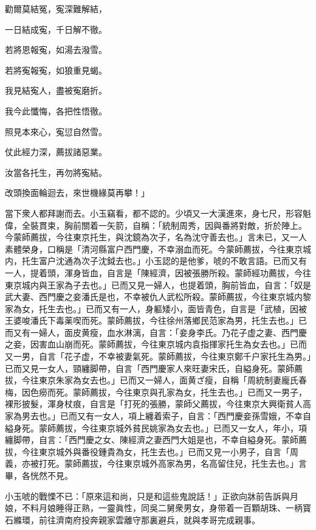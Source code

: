 \begin{myquote}
勸爾莫結冤，寃深難解結，

一日結成寃，千日解不徹。

若將恩報寃，如湯去潑雪。

若將寃報寃，如狼重見蝎。

我見結寃人，盡被寃磨折。

我今此懺悔，各把性悟徹。

照見本來心，寃愆自然雪。

仗此經力深，薦拔諸惡業。

汝當各托生，再勿將寃結。

改頭換面輪迴去，來世機緣莫再攀！」
\end{myquote}

當下衆人都拜謝而去。小玉竊看，都不認的。少頃又一大漢進來，身七尺，形容魁偉，全裝貫束，胸前關着一矢箭，自稱：「統制周秀，因與番將對敵，折於陣上。今蒙師薦拔，今往東京托生，與沈鏡為次子，名為沈守善去也。」言未已，又一人素體榮身，口稱是「清河縣富户西門慶，不幸溺血而死。今蒙師薦拔，今往東京城内，托生富户沈通為次子沈鉞去也。」小玉認的是他爹，唬的不敢言語。已而又有一人，提着頭，渾身皆血，自言是「陳經濟，因被張勝所殺。蒙師經功薦拔，今往東京城内與王家為子去也。」已而又見一婦人，也提着頭，胸前皆血，自言：「奴是武大妻、西門慶之妾潘氏是也，不幸被仇人武松所殺。蒙師薦拔，今往東京城内黎家為女，托生去也。」已而又有一人，身軀矮小，面皆青色，自言是「武植，因被王婆唆潘氏下毒薬喫而死。蒙師薦拔，今往徐州落鄉民范家為男，托生去也。」已而又有一婦人，面皮黄瘦，血水淋漓，自言：「妾身李氏。乃花子虚之妻、西門慶之妾，因害血山崩而死。蒙師薦拔，今往東京城内袁指揮家托生為女去也。」已而又一男，自言「花子虚，不幸被妻氣死。蒙師薦拔，今往東京鄭千户家托生為男。」已而又見一女人，頸纏脚帶，自言「西門慶家人來旺妻宋氏，自縊身死。蒙師薦拔，今往東京朱家為女去也。」已而又一婦人，面黄ざ瘦，自稱「周統制妻龐氏春梅，因色癆而死。蒙師薦拔，今往東京與孔家為女，托生去也。」已而又一男子，裸形披髮，渾身杖痕，自言是「打死的張勝，蒙師父薦拔，今往東京大興衛貧人高家為男去也。」已而又有一女人，項上纏着索子，自言：「西門慶妾孫雪娥，不幸自縊身死。蒙師薦拔，今往東京城外貧民姚家為女去也。」已而又一女人，年小，項纏脚帶，自言：「西門慶之女、陳經濟之妻西門大姐是也，不幸自縊身死。蒙師薦拔，今往東京城外與番役鍾貴為女，托生去也。」已而又見一小男子，自言「周義，亦被打死。蒙師薦拔，今往東京城外高家為男，名高留住兒，托生去也。」言畢，各恍然不見。

小玉唬的戰慄不已：「原來這和尚，只是和這些鬼說話！」正欲向牀前告訴與月娘，不料月娘睡得正熟，一靈眞性，同吳二舅衆男女，身带着一百顆胡珠、一柄寳石縧環，前往濟南府投奔親家雲離守那裏避兵，就與孝哥完成親事。

